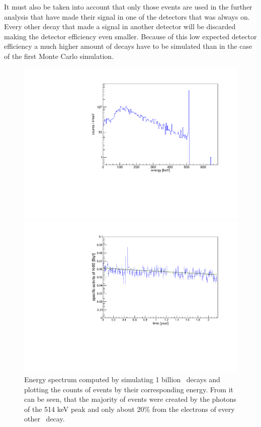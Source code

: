 \documentclass[encoding=utf8,british]{tumphthesis}
\begin{document}
It must also be taken into account that only those events are used in the further analysis that have made their signal in one of the detectors that was always on.
Every other decay that made a signal in another detector will be discarded making the detector efficiency even smaller. 
Because of this low expected detector efficiency a much higher amount of decays have to be simulated than in the case of the first Monte Carlo simulation.
\\
\begin{figure}[t!]
	\centering
	\begin{minipage}[t]{.475\textwidth}
		\centering
		\includegraphics[width=\textwidth]{./Bilder/Sim1Phasenraum.pdf}
		\caption{
			Energy spectrum computed by simulating 1 billion \Kr\ decays and plotting the counts of events by their corresponding energy.
			From it can be seen, that the majority of events were created by the photons of the 514 keV peak and only about 20$\%$ from the electrons of every other \Kr\ decay.
			}
		\label{fig:Sim1Spektrum}
	\end{minipage}\hfill%
	\begin{minipage}[t]{.475\textwidth}
		\centering
		\includegraphics[width=\textwidth]{./Bilder/Aktivitaet.pdf}

\end{minipage}
\end{figure}
\end{document}
